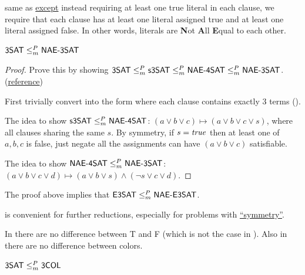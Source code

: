 \documentclass{article}
\begin{document}
\begin{definition}
  same as  \ul{except} instead requiring at least one true literal in each clause, we require that each clause has at least one literal assigned true and at least one literal assigned false. In other words, literals are {\bf N}ot {\bf A}ll {\bf E}qual to each other.
\end{definition}

\begin{theorem}
  \( \text{\sf 3SAT} \leq_m^P \text{\sf NAE-3SAT} \)
\end{theorem}

\begin{proof}
  Prove this by showing \( \text{\sf 3SAT} \leq_m^P \text{\sf s3SAT} \leq_m^P \text{\sf NAE-4SAT} \leq_m^P \text{\sf NAE-3SAT} \). (\hyperlink{https://math.stackexchange.com/questions/647710/how-do-i-reduce-3-sat-to-a-3-sat-nae-problem}{reference})

  First trivially convert  into the form where each clause contains exactly 3 terms ().

  The idea to show \( \text{\sf s3SAT} \leq_m^P \text{\sf NAE-4SAT} \): \( (a \vee b \vee c) \mapsto (a \vee b \vee c \vee s) \), where all clauses sharing the same \(s\). By symmetry, if \(s = {\it true}\) then at least one of \(a, b, c\) is false, just negate all the assignments can have \((a \vee b \vee c)\) satisfiable.

  The idea to show \( \text{\sf NAE-4SAT} \leq_m^P \text{\sf NAE-3SAT} \): \( (a \vee b \vee c \vee d) \mapsto (a \vee b \vee s) \wedge (\neg s \vee c \vee d) \).
\end{proof}

\begin{corollary}
  The proof above implies that \( \text{\sf E3SAT} \leq_m^P \text{\sf NAE-E3SAT} \).
\end{corollary}

\begin{remark}
   is convenient for further reductions, especially for problems with \ul{``symmetry''}.
\end{remark}

In  there are no difference between T and F (which is not the case in ). Also in  there are no difference between colors.

\begin{theorem}
  \( \text{\sf 3SAT} \leq_m^P \text{\sf 3COL} \)
\end{theorem}
\end{document}
